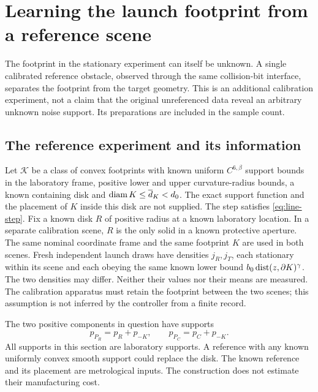 \section{Learning the launch footprint from a reference scene}
\label{sec:reference-calibration}
The footprint in the stationary experiment can itself be unknown.
A single calibrated reference obstacle, observed through the same
collision-bit interface, separates the footprint from the target
geometry. This is an additional calibration experiment, not a claim
that the original unreferenced data reveal an arbitrary unknown noise
support. Its preparations are included in the sample count.

\subsection{The reference experiment and its information}
Let $\mathcal K$ be a class of convex footprints with known uniform
$C^{6,\beta}$ support bounds in the laboratory frame, positive lower
and upper curvature-radius bounds, a known containing disk and
$\operatorname{diam} K\le\overline d_K<d_0$. The exact support function and the
placement of $K$ inside this disk are not supplied. The step satisfies
\eqref{eq:line-step}. Fix a known disk $R$ of positive radius at a
known laboratory location. In a separate calibration scene, $R$ is
the only solid in a known protective aperture. The same nominal
coordinate frame and the same footprint $K$ are used in both scenes.
Fresh independent launch draws have densities $j_R,j_T$, each stationary
within its scene and each obeying the same known lower bound
$b_0\operatorname{dist}(z,\partial K)^\gamma$. The two densities may differ.
Neither their values nor their means are measured. The calibration
apparatus must retain the footprint between the two scenes; this
assumption is not inferred by the controller from a finite record.

The two positive components in question have supports
\begin{equation}\label{eq:reference-addition}
 p_{P_R}=p_R+p_{-K},\qquad p_{P_C}=p_C+p_{-K}.
\end{equation}
All supports in this section are laboratory supports. A reference
with any known uniformly convex smooth support could replace the disk.
The known reference and its placement are metrological inputs. The
construction does not estimate their manufacturing cost.

